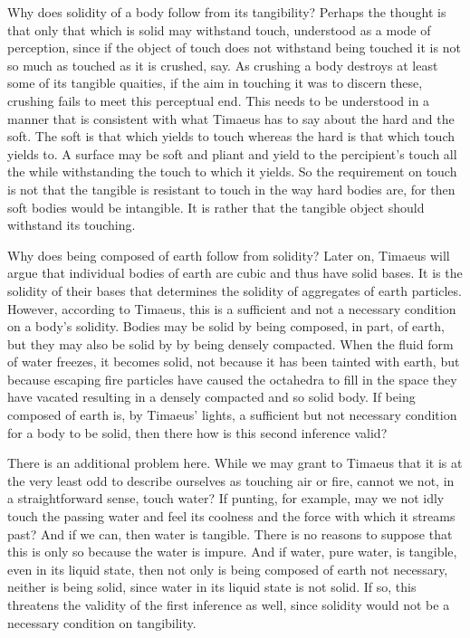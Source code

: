 Why does solidity of a body follow from its tangibility? Perhaps the thought is that only that which is solid may withstand touch, understood as a mode of perception, since if the object of touch does not withstand being touched it is not so much as touched as it is crushed, say. As crushing a body destroys at least some of its tangible quaities, if the aim in touching it was to discern these, crushing fails to meet this perceptual end. This needs to be understood in a manner that is consistent with what Timaeus has to say about the hard and the soft. The soft is that which yields to touch whereas the hard is that which touch yields to. A surface may be soft and pliant and yield to the percipient's touch all the while withstanding the touch to which it yields. So the requirement on touch is not that the tangible is resistant to touch in the way hard bodies are, for then soft bodies would be intangible. It is rather that the tangible object should withstand its touching.

Why does being composed of earth follow from solidity? Later on, Timaeus will argue that individual bodies of earth are cubic and thus have solid bases. It is the solidity of their bases that determines the solidity of aggregates of earth particles. However, according to Timaeus, this is a sufficient and not a necessary condition on a body's solidity. Bodies may be solid by being composed, in part, of earth, but they may also be solid by by being densely compacted. When the fluid form of water freezes, it becomes solid, not because it has been tainted with earth, but because escaping fire particles have caused the octahedra to fill in the space they have vacated resulting in a densely compacted and so solid body. If being composed of earth is, by Timaeus' lights, a sufficient but not necessary condition for a body to be solid, then there how is this second inference valid?

There is an additional problem here. While we may grant to Timaeus that it is at the very least odd to describe ourselves as touching air or fire, cannot we not, in a straightforward sense, touch water? If punting, for example, may we not idly touch the passing water and feel its coolness and the force with which it streams past? And if we can, then water is tangible. There is no reasons to suppose that this is only so because the water is impure.  And if water, pure water, is tangible, even in its liquid state, then not only is being composed of earth not necessary, neither is being solid, since water in its liquid state is not solid. If so, this threatens the validity of the first inference as well, since solidity would not be a necessary condition on tangibility.

